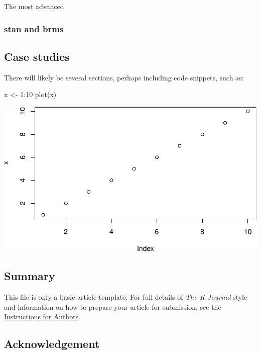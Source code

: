The most advanced

\hypertarget{stan-and-brms}{%
\subsubsection{stan and brms}\label{stan-and-brms}}

\hypertarget{case-studies}{%
\subsection{Case studies}\label{case-studies}}

There will likely be several sections, perhaps including code snippets,
such as:

\begin{Schunk}
\begin{Sinput}
x <- 1:10
plot(x)
\end{Sinput}

\includegraphics{overview-single-source_files/figure-latex/unnamed-chunk-3-1} \end{Schunk}

\hypertarget{summary}{%
\subsection{Summary}\label{summary}}

This file is only a basic article template. For full details of
\emph{The R Journal} style and information on how to prepare your
article for submission, see the
\href{https://journal.r-project.org/share/author-guide.pdf}{Instructions
for Authors}.

\hypertarget{acknowledgement}{%
\subsection{Acknowledgement}\label{acknowledgement}}

